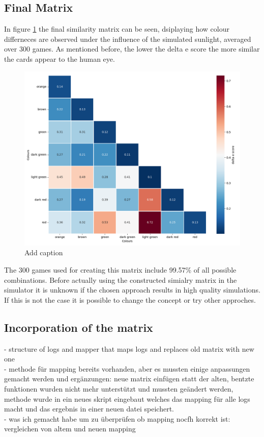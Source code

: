 \subsection{Final Matrix}
In figure \ref{fig:simMatrix} the final similarity matrix can be seen, dsiplaying how colour differneces are observed under the influence of the simulated sunlight, averaged over 300 games. As mentioned before, the lower the delta e score the more similar the cards appear to the human eye. 
\begin{figure}[H]
	\centering
	\includegraphics[width=15cm]{images/simMatrix.png}
	\caption[Bild kurz]{Add caption}
	\label{fig:simMatrix}
\end{figure}
The 300 games used for creating this matrix include 99.57\% of all possible combinations. Before actually using the constructed simialry matrix in the simulator it is unknown if the chosen approach results in high quality simulations. If this is not the case it is possible to change the concept or try other approches. 

\subsection{Incorporation of the matrix}


- structure of logs and mapper that maps logs and replaces old matrix with new one\\
- methode für mapping bereits vorhanden, aber es mussten einige anpassungen gemacht werden und ergänzungen: neue matrix einfügen statt der alten, bentzte funktionen wurden nicht mehr unterstützt und mussten geändert werden, methode wurde in ein neues skript eingebaut welches das mapping für alle logs macht und das ergebnis in einer neuen datei speichert.\\
- was ich gemacht habe um zu überprüfen ob mapping nocfh korrekt ist: vergleichen von altem und neuen mapping 


